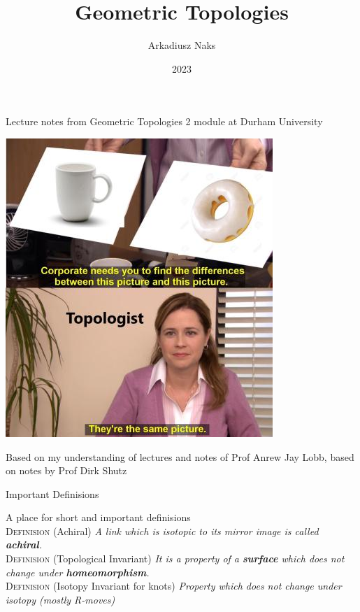 \documentclass[12pt, letterpaper]{article}
\title{Geometric Topologies}
\author{Arkadiusz Naks}
\date{2023}
\begin{document}
\begin{titlepage}
  \begin{center}
    \makeatletter
    \vspace*{1cm}
    \Huge
    \textbf{\@title}

    \vspace{0.5cm}
    \Large
    Lecture notes from Geometric Topologies 2 module at Durham University

    \vspace{1.5cm}

    \textbf{\@author}

    \includegraphics[scale=0.55]{geo.png}
    \vfill

    \vspace{0.8cm}

    \small
    Based on my understanding of lectures and notes of Prof Anrew Jay Lobb,
    based on notes by Prof Dirk Shutz\\
    
    \@date{}
  \end{center}
\end{titlepage}

\tableofcontents
\newpage

\begin{section}{Important Definisions}

  A place for short and important definisions \\
  \textsc{Definision} (Achiral) \textit{A link which is isotopic to its
    mirror image is called \textbf{achiral}.} \\
  \textsc{Definision} (Topological Invariant) \textit{It is a property of
    a \textbf{surface} which does not change under \textbf{homeomorphism}.} \\
  \textsc{Definision} (Isotopy Invariant for knots) \textit{Property which does
    not change under isotopy (mostly R-moves)}

\end{section}
\end{document}
